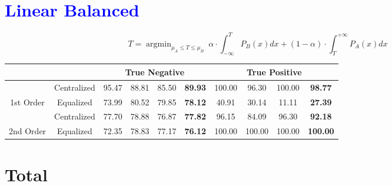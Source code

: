 \documentclass[10pt,a4paper]{article}
\begin{document}
	\section{\textcolor{blue}{Linear Balanced}}
		$$T = \mathop{\arg\min}_{\mu_A \le T \le \mu_B}\ \alpha \cdot \int_{-\infty}^{T}P_B(x)dx + (1 - \alpha) \cdot \int_{T}^{+\infty}P_A(x)dx$$
		\begin{table}[!h]
			\centering
			\begin{tabular}{|c|c|c|c|c|c|c|c|c|c|}
				\hline
				&             & \multicolumn{4}{c|}{True Negative}                            & \multicolumn{4}{c|}{True Positive}                                \\ \hline
				& Centralized & 95.47 & 88.81 & 85.50 & {\color[HTML]{FE0000} \textbf{89.93}} & 100.00 & 96.30  & 100.00 & {\color[HTML]{FE0000} \textbf{98.77}}  \\ \cline{2-10} 
				\multirow{-2}{*}{1st Order} & Equalized   & 73.99 & 80.52 & 79.85 & {\color[HTML]{FE0000} \textbf{78.12}} & 40.91  & 30.14  & 11.11  & {\color[HTML]{FE0000} \textbf{27.39}}  \\ \hline
				& Centralized & 77.70 & 78.88 & 76.87 & {\color[HTML]{FE0000} \textbf{77.82}} & 96.15  & 84.09  & 96.30  & {\color[HTML]{FE0000} \textbf{92.18}}  \\ \cline{2-10} 
				\multirow{-2}{*}{2nd Order} & Equalized   & 72.35 & 78.83 & 77.17 & {\color[HTML]{FE0000} \textbf{76.12}} & 100.00 & 100.00 & 100.00 & {\color[HTML]{FE0000} \textbf{100.00}} \\ \hline
			\end{tabular}
		\end{table}
		
	\section*{Total}
	
\end{document}

